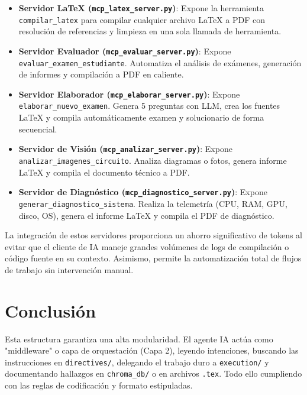 \documentclass[12pt,a4paper]{article}
\begin{document}
\begin{itemize}
    \item \textbf{Servidor LaTeX (\texttt{mcp\_latex\_server.py})}: Expone la herramienta \texttt{compilar\_latex} para compilar cualquier archivo LaTeX a PDF con resolución de referencias y limpieza en una sola llamada de herramienta.
    \item \textbf{Servidor Evaluador (\texttt{mcp\_evaluar\_server.py})}: Expone \texttt{evaluar\_examen\_estudiante}. Automatiza el análisis de exámenes, generación de informes y compilación a PDF en caliente.
    \item \textbf{Servidor Elaborador (\texttt{mcp\_elaborar\_server.py})}: Expone \texttt{elaborar\_nuevo\_examen}. Genera 5 preguntas con LLM, crea los fuentes LaTeX y compila automáticamente examen y solucionario de forma secuencial.
    \item \textbf{Servidor de Visión (\texttt{mcp\_analizar\_server.py})}: Expone \texttt{analizar\_imagenes\_circuito}. Analiza diagramas o fotos, genera informe LaTeX y compila el documento técnico a PDF.
    \item \textbf{Servidor de Diagnóstico (\texttt{mcp\_diagnostico\_server.py})}: Expone \texttt{generar\_diagnostico\_sistema}. Realiza la telemetría (CPU, RAM, GPU, disco, OS), genera el informe LaTeX y compila el PDF de diagnóstico.
\end{itemize}

La integración de estos servidores proporciona un ahorro significativo de tokens al evitar que el cliente de IA maneje grandes volúmenes de logs de compilación o código fuente en su contexto. Asimismo, permite la automatización total de flujos de trabajo sin intervención manual.

\section{Conclusión}
Esta estructura garantiza una alta modularidad. El agente IA actúa como "middleware" o capa de orquestación (Capa 2), leyendo intenciones, buscando las instrucciones en \texttt{directives/}, delegando el trabajo duro a \texttt{execution/} y documentando hallazgos en \texttt{chroma\_db/} o en archivos \texttt{.tex}. Todo ello cumpliendo con las reglas de codificación y formato estipuladas.
\end{document}
